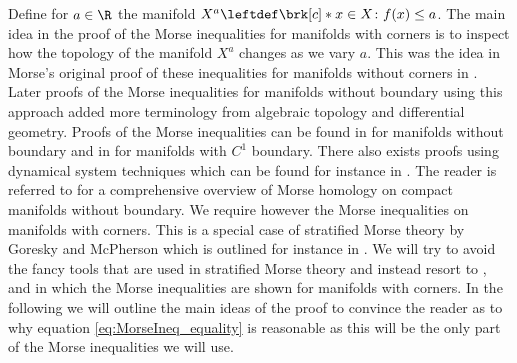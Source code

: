 Define for $a\in\R$ the manifold $X^a\leftdef\brk[c]*{x\in X\colon f(x)\leq a}$.
The main idea in the proof of the Morse inequalities for manifolds with corners is to inspect how the topology of the manifold $X^a$ changes as we vary $a$.
This was the idea in Morse's original proof of these inequalities for manifolds without corners in \cite{Morse1925}.
Later proofs of the Morse inequalities for manifolds without boundary using this approach added more terminology from algebraic topology and differential geometry.
Proofs of the Morse inequalities can be found in \cite[§5]{Milnor1963} for manifolds without boundary and 
in \cite[Theorem 10.2']{Morse1969} for manifolds with $C^1$ boundary.
There also exists proofs using dynamical system techniques
which can be found for instance in \cite{Smale1960}.
The reader is referred to \cite{Banyaga2004} for a comprehensive overview of Morse homology
on compact manifolds without boundary.
We require however the Morse inequalities on manifolds with corners.
This is a special case of stratified Morse theory by Goresky and McPherson which is outlined for instance in \cite[§5.5]{Cisneros2020}.
We will try to avoid the fancy tools that are used in stratified Morse theory and instead
resort to \cite{Braess1974}, \cite{Agrach1991} and \cite{Handron2002} in which the Morse inequalities are shown for
manifolds with corners.
In the following we will outline the main ideas of the proof to convince the reader
as to why equation \eqref{eq:MorseIneq_equality} is reasonable as this will be the only part of the 
Morse inequalities we will use.
% 
